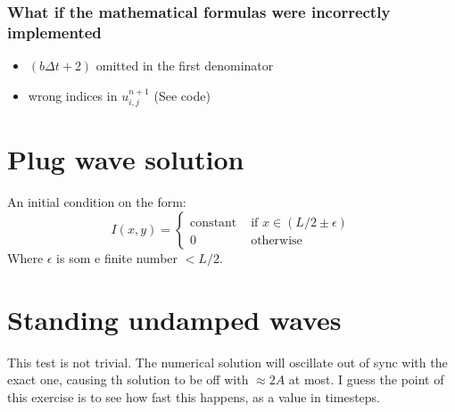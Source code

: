 \documentclass[a4paper]{article}
\begin{document}
\subsubsection{What if the mathematical formulas were incorrectly implemented}
\begin{itemize}
\item $(b\Delta t +2)$ omitted in the first denominator
\item wrong indices in $u_{i, j}^{n+1}$ (See code)
\end{itemize}

\section{Plug wave solution}
An initial condition on the form:
\begin{equation}
I(x, y) = 
\begin{cases}
\text{constant} & \text{ if } x\in (L/2\pm\epsilon) \\
0 & \text{ otherwise}
\end{cases}	
\end{equation}
Where $\epsilon$ is som e finite number $< L/2$.


\section{Standing undamped waves}
This test is not trivial. The numerical solution will oscillate out of sync with the exact one, causing th solution to be off with $\approx 2A$ at most. I guess the point of this exercise is to see how fast this happens, as a value in timesteps. 
\end{document}
